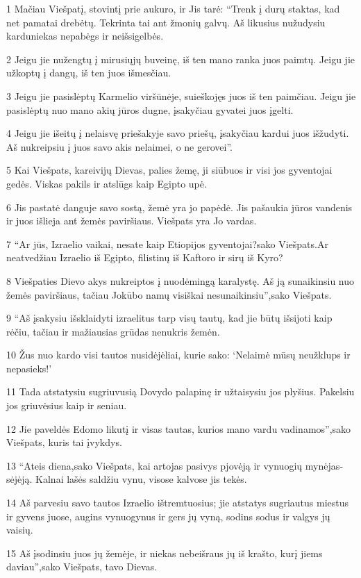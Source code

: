\par 1 Mačiau Viešpatį, stovintį prie aukuro, ir Jis tarė: “Trenk į durų staktas, kad net pamatai drebėtų. Tekrinta tai ant žmonių galvų. Aš likusius nužudysiu kardu­niekas nepabėgs ir neišsigelbės. 
\par 2 Jeigu jie nužengtų į mirusiųjų buveinę, iš ten mano ranka juos paimtų. Jeigu jie užkoptų į dangų, iš ten juos išmesčiau. 
\par 3 Jeigu jie pasislėptų Karmelio viršūnėje, suieškojęs juos iš ten paimčiau. Jeigu jie pasislėptų nuo mano akių jūros dugne, įsakyčiau gyvatei juos įgelti. 
\par 4 Jeigu jie išeitų į nelaisvę priešakyje savo priešų, įsakyčiau kardui juos išžudyti. Aš nukreipsiu į juos savo akis nelaimei, o ne gerovei”. 
\par 5 Kai Viešpats, kareivijų Dievas, palies žemę, ji siūbuos ir visi jos gyventojai gedės. Viskas pakils ir atslūgs kaip Egipto upė. 
\par 6 Jis pastatė danguje savo sostą, žemė yra jo papėdė. Jis pašaukia jūros vandenis ir juos išlieja ant žemės paviršiaus. Viešpats yra Jo vardas. 
\par 7 “Ar jūs, Izraelio vaikai, nesate kaip Etiopijos gyventojai?­sako Viešpats.­Ar neatvedžiau Izraelio iš Egipto, filistinų iš Kaftoro ir sirų iš Kyro? 
\par 8 Viešpaties Dievo akys nukreiptos į nuodėmingą karalystę. Aš ją sunaikinsiu nuo žemės paviršiaus, tačiau Jokūbo namų visiškai nesunaikinsiu”,­sako Viešpats. 
\par 9 “Aš įsakysiu išsklaidyti izraelitus tarp visų tautų, kad jie būtų išsijoti kaip rėčiu, tačiau ir mažiausias grūdas nenukris žemėn. 
\par 10 Žus nuo kardo visi tautos nusidėjėliai, kurie sako: ‘Nelaimė mūsų neužklups ir nepasieks!’ 
\par 11 Tada atstatysiu sugriuvusią Dovydo palapinę ir užtaisysiu jos plyšius. Pakelsiu jos griuvėsius kaip ir seniau. 
\par 12 Jie paveldės Edomo likutį ir visas tautas, kurios mano vardu vadinamos”,­sako Viešpats, kuris tai įvykdys. 
\par 13 “Ateis diena,­sako Viešpats,­ kai artojas pasivys pjovėją ir vynuogių mynėjas­sėjėją. Kalnai lašės saldžiu vynu, visose kalvose jis tekės. 
\par 14 Aš parvesiu savo tautos Izraelio ištremtuosius; jie atstatys sugriautus miestus ir gyvens juose, augins vynuogynus ir gers jų vyną, sodins sodus ir valgys jų vaisių. 
\par 15 Aš įsodinsiu juos jų žemėje, ir niekas nebeišraus jų iš krašto, kurį jiems daviau”,­sako Viešpats, tavo Dievas.



